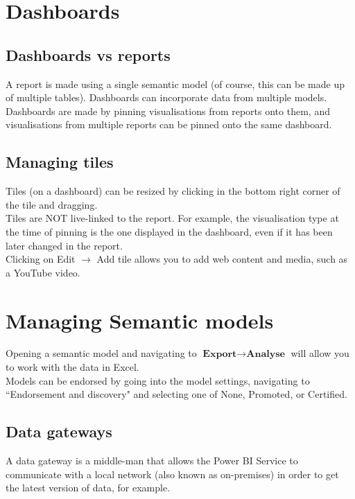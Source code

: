 \documentclass[10pt, openany, twocolumn]{book}
\begin{document}
\section{Dashboards}

\subsection*{Dashboards vs reports}

A report is made using a single semantic model (of course, this can be made up of multiple tables). Dashboards can incorporate data from multiple models. Dashboards are made by pinning visualisations from reports onto them, and visualisations from multiple reports can be pinned onto the same dashboard.

\subsection*{Managing tiles}

Tiles (on a dashboard) can be resized by clicking in the bottom right corner of the tile and dragging. \\

Tiles are NOT live-linked to the report. For example, the visualisation type at the time of pinning is the one displayed in the dashboard, even if it has been later changed in the report.\\

Clicking on Edit $\rightarrow$ Add tile allows you to add web content and media, such as a YouTube video.

\section{Managing Semantic models}

Opening a semantic model and navigating to $\textbf{Export} \rightarrow \textbf{Analyse}$ will allow you to work with the data in Excel.\\

Models can be endorsed by going into the model settings, navigating to ``Endorsement and discovery" and selecting one of None, Promoted, or Certified.\\

\subsection*{Data gateways}

A data gateway is a middle-man that allows the Power BI Service to communicate with a local network (also known as on-premises) in order to get the latest version of data, for example.  \\
\end{document}
